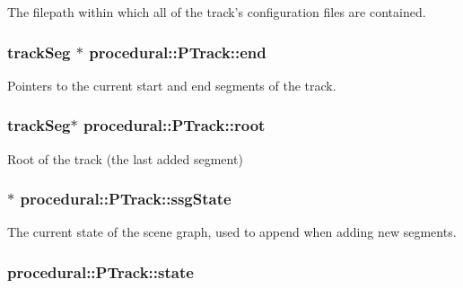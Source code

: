 The filepath within which all of the track's configuration files are contained. \hypertarget{classprocedural_1_1_p_track_ac9001885365980b067a13749419416e6}{
\subsubsection[{end}]{\setlength{\rightskip}{0pt plus 5cm}track\-Seg $\ast$ procedural\-::\-P\-Track\-::end\hspace{0.3cm}{\ttfamily [private]}}}\label{classprocedural_1_1_p_track_ac9001885365980b067a13749419416e6}
Pointers to the current start and end segments of the track. \hypertarget{classprocedural_1_1_p_track_a29673df8a7e92648d375d64462334159}{
\subsubsection[{root}]{\setlength{\rightskip}{0pt plus 5cm}track\-Seg$\ast$ procedural\-::\-P\-Track\-::root}}\label{classprocedural_1_1_p_track_a29673df8a7e92648d375d64462334159}
Root of the track (the last added segment) \hypertarget{classprocedural_1_1_p_track_ab3612b80647c9900fc41b26a89d486a1}{
\subsubsection[{ssg\-State}]{$\ast$ procedural\-::\-P\-Track\-::ssg\-State\hspace{0.3cm}{\ttfamily [private]}}}\label{classprocedural_1_1_p_track_ab3612b80647c9900fc41b26a89d486a1}
The current state of the scene graph, used to append when adding new segments. \hypertarget{classprocedural_1_1_p_track_a1ad479bf26237af933ae14a838b61046}{
\subsubsection[{state}]{ procedural\-::\-P\-Track\-::state}}\label{classprocedural_1_1_p_track_a1ad479bf26237af933ae14a838b61046}
